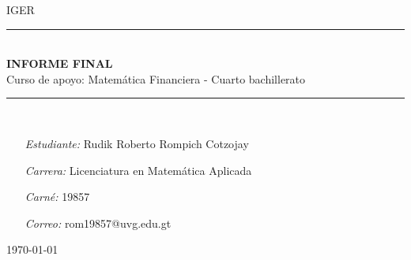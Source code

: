\begin{titlepage}
\thispagestyle{empty}
\newcommand{\HRule}{\rule{\linewidth}{0.5mm}}
\hspace{1cm}
\center

\textsc{\huge IGER}\\[2.0cm]

\HRule\\[1.4cm]
\MSdoublespacing
{ \huge \bfseries INFORME FINAL}\\[0.2cm]
{ \large Curso de apoyo: Matemática Financiera - Cuarto bachillerato}\\[0.3cm] %
\HRule \\[2.4cm]
\MSonehalfspacing

\begin{minipage}[t]{0.8\textwidth}
	\begin{itemize}
	\item[\emph{Estudiante:}] Rudik Roberto Rompich Cotzojay
	\item[\emph{Carrera:}] Licenciatura en Matemática Aplicada
	\item[\emph{Carné:}] 19857
	\item[\emph{Correo:}] rom19857@uvg.edu.gt
	\end{itemize}
\end{minipage}

\vspace{2.9cm}

\flushright \today
\end{titlepage}
\restoregeometry

\tableofcontents
{}
\thispagestyle{empty}

\MSonehalfspacing
\newpage
\setcounter{page}{1}
\pagestyle{fancy}